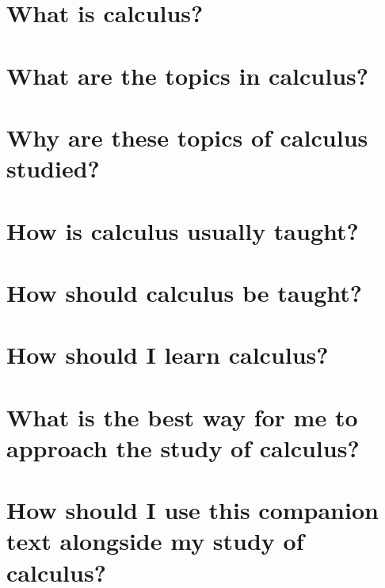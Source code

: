\section{What is calculus?}

\section{What are the topics in calculus?}

\section{Why are these topics of calculus studied?}

\section{How is calculus usually taught?}

\section{How should calculus be taught?}

\section{How should I learn calculus?}

\section{What is the best way for me to approach the study of calculus?}

\section{How should I use this companion text alongside my study of calculus?}
